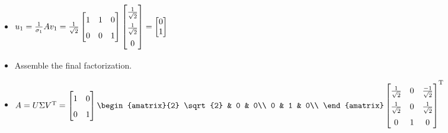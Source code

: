 \documentclass{article}
\begin{document}
\begin{itemize}
\begin{itemize}
        \item $
            u_1 = \frac{1}{\sigma_1}Av_1 = \frac{1}{\sqrt{2}}
            \begin{bmatrix}
                1 & 1 & 0\\
                0 & 0 & 1\\
            \end{bmatrix}
            \renewcommand{\arraystretch}{1.6}
            \begin{bmatrix}
                \frac{1}{\sqrt{2}}\\
                \frac{1}{\sqrt{2}}\\
                0\\
            \end{bmatrix}
            \renewcommand{\arraystretch}{1}
            =
            \begin{bmatrix}
                0\\
                1\\
            \end{bmatrix}
        $
        \item Assemble the final factorization.
        \item $
            A = U\Sigma V^\T =
            \begin{bmatrix}
                1 & 0\\
                0 & 1\\
            \end{bmatrix}
            \begin{amatrix}{2}
                \sqrt{2} & 0 & 0\\
                0 & 1 & 0\\
            \end{amatrix}
            \renewcommand{\arraystretch}{1.6}
            \begin{bmatrix}
                \frac{1}{\sqrt{2}} & 0 & \frac{-1}{\sqrt{2}}\\
                \frac{1}{\sqrt{2}} & 0 & \frac{1}{\sqrt{2}}\\
                0 & 1 & 0\\
            \end{bmatrix}^\T
        $
    \end{itemize}
\end{itemize}
\end{document}
